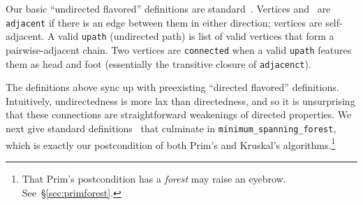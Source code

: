 


Our basic ``undirected flavored'' definitions are
standard~\cite{clrs}.
Vertices  and~ are \texttt{adjacent} if there is
an edge between them in either direction; vertices are self-adjacent.
A valid \texttt{upath} (undirected path) is list of
valid vertices that form a
pairwise-adjacent chain. Two vertices are \texttt{connected} when a valid \texttt{upath}
features them as head and foot (essentially the transitive
closure of \texttt{adjacenct}).

The definitions above sync up with preexisting ``directed
flavored'' definitions.
Intuitively, undirectedness is more lax than directedness,
and so it is unsurprising that these connections are straightforward
weakenings of directed properties.
We next give standard definitions~\cite{clrs} that culminate in
\texttt{minimum\_spanning\_forest}, which is exactly our postcondition
of both Prim's and Kruskal's algorithms.\footnote{That Prim's postcondition has
a \emph{forest} may raise an eyebrow. See~\S\ref{sec:primforest}.}




